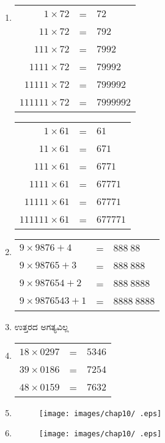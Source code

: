 \begin{enumerate}
\item 
\begin{tabular}[t]{rcl}
$1\times 72$ & = & $72$\\
$11\times 72$ & = & $792$\\
$111\times 72$ & = & $7992$\\
$1111\times 72$ & = & $79992$\\
$11111\times 72$ & = & $799992$\\
$111111\times 72$ & = & $7999992$
\end{tabular}

\begin{tabular}[t]{rcl}
$1\times 61$ & = & $61$\\
$11\times 61$ & = & $671$\\
$111\times 61$ & = & $6771$\\
$1111\times 61$ & = & $67771$\\
$11111\times 61$ & = & $67771$\\
$111111\times 61$ & = & $677771$
\end{tabular}

\item 
\begin{tabular}[t]{lll}
$9\times 9876 + 4$ & = & $888~88$\\
$9\times 98765 + 3$ & = & $888~888$\\
$9\times 987654 + 2$ & = & $888~8888$\\
$9\times 9876543 + 1$ & = & $8888~8888$\\
\end{tabular}

\item ಉತ್ತರದ ಅಗತ್ಯವಿಲ್ಲ 

\item 
\begin{tabular}[t]{lll}
$18\times 0297$ & = & $5346$\\
$39\times 0186$ & = & $7254$\\
$48\times 0159$ & = & $7632$
\end{tabular}

\item 
\begin{figure}[!h]
\centering
\texttt{[image: images/chap10/ .eps]}
\end{figure}

\item 
\begin{figure}[!h]
\centering
\texttt{[image: images/chap10/ .eps]}
\end{figure}


\end{enumerate}

